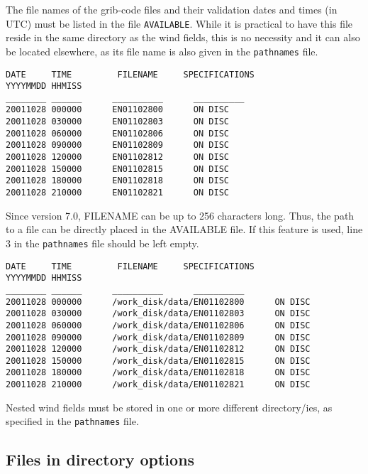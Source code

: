 \documentclass{egu}            %
\begin{document}
The file names of the grib-code files and their validation dates and times (in UTC) must be listed in the file \verb|AVAILABLE|. While it is practical to have this file reside in the same directory as the wind fields, this is no necessity and it can also be located elsewhere, as its file name is also given in the \verb|pathnames| file.
\begin{footnotesize}\begin{verbatim}
DATE     TIME         FILENAME     SPECIFICATIONS
YYYYMMDD HHMISS
________ ______      __________      __________
20011028 000000      EN01102800      ON DISC
20011028 030000      EN01102803      ON DISC
20011028 060000      EN01102806      ON DISC
20011028 090000      EN01102809      ON DISC
20011028 120000      EN01102812      ON DISC
20011028 150000      EN01102815      ON DISC
20011028 180000      EN01102818      ON DISC
20011028 210000      EN01102821      ON DISC
\end{verbatim}\end{footnotesize}

Since version 7.0, FILENAME can be up to 256 characters long.  Thus, the path
to a file can be directly placed in the AVAILABLE file.  If this feature is
used, line 3 in the \verb|pathnames| file should be left empty.
\begin{footnotesize}\begin{verbatim}
DATE     TIME         FILENAME     SPECIFICATIONS
YYYYMMDD HHMISS
________ ______      __________      __________
20011028 000000      /work_disk/data/EN01102800      ON DISC
20011028 030000      /work_disk/data/EN01102803      ON DISC
20011028 060000      /work_disk/data/EN01102806      ON DISC
20011028 090000      /work_disk/data/EN01102809      ON DISC
20011028 120000      /work_disk/data/EN01102812      ON DISC
20011028 150000      /work_disk/data/EN01102815      ON DISC
20011028 180000      /work_disk/data/EN01102818      ON DISC
20011028 210000      /work_disk/data/EN01102821      ON DISC
\end{verbatim}\end{footnotesize}

Nested wind fields must be stored in one or more different directory/ies, as specified in the \verb|pathnames| file.

\newpage

\subsection{Files in directory options}
\end{document}
